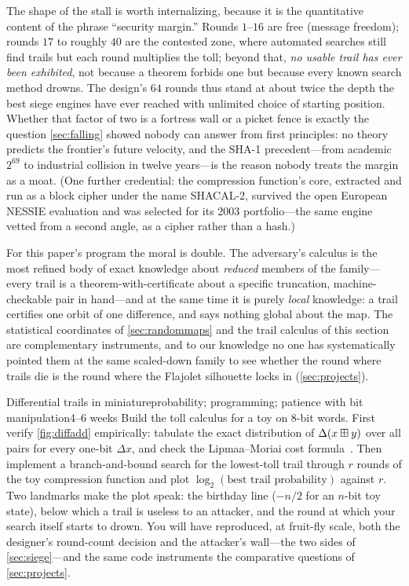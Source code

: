 The shape of the stall is worth internalizing, because it is the
quantitative content of the phrase ``security margin.'' Rounds $1$--$16$
are free (message freedom); rounds $17$ to roughly $40$ are the
contested zone, where automated searches still find trails but each
round multiplies the toll; beyond that, \emph{no usable trail has ever
been exhibited}, not because a theorem forbids one but because every
known search method drowns. The design's $64$ rounds thus stand at
about twice the depth the best siege engines have ever reached with
unlimited choice of starting position. Whether that factor of two is a
fortress wall or a picket fence is exactly the question
\cref{sec:falling} showed nobody can answer from first principles: no
theory predicts the frontier's future velocity, and the SHA-1
precedent---from academic $2^{69}$ to industrial collision in twelve
years---is the reason nobody treats the margin as a moat. (One further
credential: the compression function's core, extracted and run as a
block cipher under the name SHACAL-2, survived the open European
NESSIE evaluation and was selected for its 2003 portfolio---the same
engine vetted from a second angle, as a cipher rather than a hash.)

For this paper's program the moral is double. The adversary's calculus
is the most refined body of exact knowledge about \emph{reduced}
members of the family---every trail is a theorem-with-certificate about
a specific truncation, machine-checkable pair in hand---and at the same
time it is purely \emph{local} knowledge: a trail certifies one orbit
of one difference, and says nothing global about the map. The
statistical coordinates of \cref{sec:randommaps} and the trail calculus
of this section are complementary instruments, and to our knowledge no
one has systematically pointed them at the same scaled-down family to
see whether the round where trails die is the round where the Flajolet
silhouette locks in (\cref{sec:projects}).

\begin{project}{Differential trails in miniature}{probability;
  programming; patience with bit manipulation}{4--6 weeks}
  Build the toll calculus for a toy \SHA{} on $8$-bit words. First
  verify \cref{fig:diffadd} empirically: tabulate the exact
  distribution of $\Delta(x \boxplus y)$ over all pairs for every
  one-bit $\Delta x$, and check the Lipmaa--Moriai
  cost formula~\citep{LipmaaMoriai2001}. Then implement a
  branch-and-bound search for the lowest-toll trail through $r$ rounds
  of the toy compression function and plot $\log_2(\text{best trail
  probability})$ against $r$. Two landmarks make the plot speak: the
  birthday line ($-n/2$ for an $n$-bit toy state), below which a trail
  is useless to an attacker, and the round at which your search itself
  starts to drown. You will have reproduced, at fruit-fly scale, both
  the designer's round-count decision and the attacker's wall---the two
  sides of \cref{sec:siege}---and the same code instruments the
  comparative questions of \cref{sec:projects}.
\end{project}

